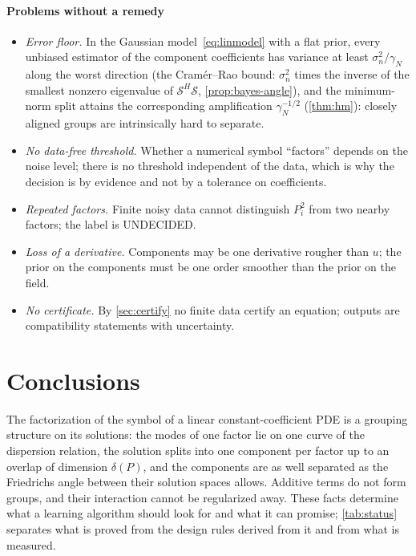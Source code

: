 \documentclass[11pt]{article}
\theoremstyle{plain}
\theoremstyle{definition}
\theoremstyle{remark}
\newcommand{\sumop}{\mathcal{S}}            %
\newcommand{\gN}{\gamma_{N}}                %
\newcommand{\deltaP}{\delta(P)}             %
\newcommand{\noise}{\sigma_{n}}             %
\newcommand{\lab}[1]{\textsf{#1}}           %
\newcommand{\UND}{\lab{UNDECIDED}}
\begin{document}
\paragraph{Problems without a remedy}
\begin{itemize}
  \item \emph{Error floor.} In the Gaussian model~\eqref{eq:linmodel} with a flat prior, every unbiased estimator of the
  component coefficients has variance at least $\noise^2/\gN$ along the worst direction (the Cram\'er--Rao bound: $\noise^2$ times the
  inverse of the smallest nonzero eigenvalue of $\sumop^H\sumop$, \cref{prop:bayes-angle}), and the minimum-norm split attains
  the corresponding amplification $\gN^{-1/2}$ (\cref{thm:hm}):
  closely aligned groups are intrinsically hard to separate.
  \item \emph{No data-free threshold.} Whether a numerical symbol ``factors'' depends on the noise level;
  there is no threshold independent of the data, which is why the decision is by evidence and not by a
  tolerance on coefficients.
  \item \emph{Repeated factors.} Finite noisy data cannot distinguish $P_i^2$ from two nearby factors;
  the label is \UND.
  \item \emph{Loss of a derivative.} Components may be one derivative rougher than $u$; the prior on the
  components must be one order smoother than the prior on the field.
  \item \emph{No certificate.} By \cref{sec:certify} no finite data certify an equation; outputs are
  compatibility statements with uncertainty.
\end{itemize}




\section{Conclusions}\label{sec:conclusion}
The factorization of the symbol of a linear constant-coefficient PDE is a grouping structure on its solutions: the
modes of one factor lie on one curve of the dispersion relation, the solution splits into one component per factor up
to an overlap of dimension $\deltaP$, and the components are as well separated as the Friedrichs angle between their
solution spaces allows. Additive terms do not form groups, and their interaction cannot be regularized away. These
facts determine what a learning algorithm should look for and what it can promise; \cref{tab:status} separates what is
proved from the design rules derived from it and from what is measured.
\end{document}
